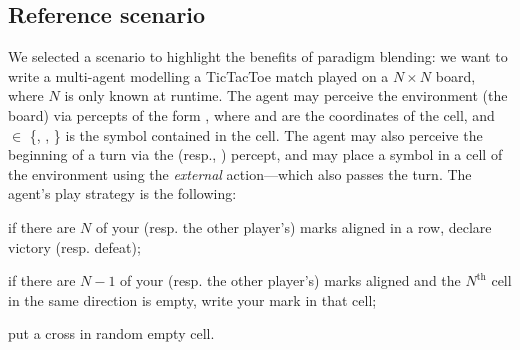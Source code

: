 \subsection{Reference scenario}\label{sec:reference-scenario}

We selected a scenario to highlight the benefits of paradigm blending:
we want to write a multi-agent modelling a TicTacToe match played on a $N \times N$ board,
where $N$ is only known at runtime.
%
The agent may perceive the environment (the board) via percepts of the form ,
where  and  are the coordinates of the cell,
and  $\in$ \{, , \} is the symbol contained in the cell.
%
The agent may also perceive the beginning of a turn via the  (resp., ) percept,
and may place a symbol in a cell of the environment using the  \emph{external} action---which also passes the turn.
%
The agent's play strategy is the following:
%
\begin{inlinelist}
    \item if there are $N$ of your (resp. the other player's) marks aligned in a row, declare victory (resp. defeat);
    \item if there are $N-1$ of your (resp. the other player's) marks aligned
    and the $N^\text{th}$ cell in the same direction is empty,
    write your mark in that cell;
    \item put a cross in random empty cell.
\end{inlinelist}

